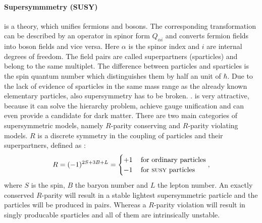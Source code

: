 \paragraph{Supersymmmetry (SUSY)} is a theory, which unifies fermions and bosons. The corresponding transformation can be described by an operator in spinor form $Q_{\alpha i}$ and converts fermion fields into boson fields and vice versa. Here $\alpha$ is the spinor index and $i$ are internal degrees of freedom. The field pairs are called superpartners (sparticles) and belong to the same multiplet. The difference between particles and sparticles is the spin quantum number which distinguishes them by half an unit of $\hbar$. \cite{Vergados} Due to the lack of evidence of sparticles in the same mass range as the already known elementary particles, also supersymmetry has to be broken. \cite{PhysTeV}. {\SUSY} is very attractive, because it can solve the hierarchy problem, achieve gauge unification and can even provide a candidate for dark matter. \cite{Nagashima} There are two main categories of supersymmetric models, namely $R$-parity conserving and $R$-parity violating models. $R$ is a discrete symmetry in the coupling of particles and their superpartners, defined as \cite{Vergados}:
\begin{align}
                        R=(-1)^{2S+3B+L}=                                       \begin{cases}
                                        +1 & \, \text{for ordinary particles} \\
                                        -1 & \, \text{for {\textsc{susy}} particles}     \end{cases}
                                        \text{,}
\label{Rparity}
\end{align}
where $S$ is the spin, $B$ the baryon number and $L$ the lepton number. An exactly conserved $R$-parity will result in a stable lightest supersymmetric particle and the {\SUSY} particles will be produced in pairs. Whereas a $R$-parity violation will result in singly producable sparticles and all of them are intrinsically unstable. \cite{Kuze}
